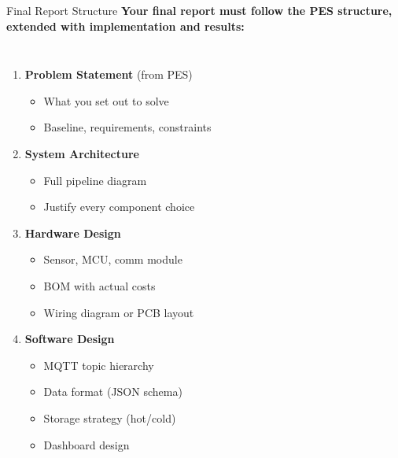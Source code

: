 \documentclass[aspectratio=169,11pt]{beamer}
\begin{document}
\begin{frame}{Final Report Structure}
    \textbf{Your final report must follow the PES structure, extended with implementation and results:}

    \vspace{0.2cm}
    \begin{columns}
        \begin{enumerate}
            \item \textbf{Problem Statement} (from PES)
            \begin{itemize}
                \item What you set out to solve
                \item Baseline, requirements, constraints
            \end{itemize}
            \item \textbf{System Architecture}
            \begin{itemize}
                \item Full pipeline diagram
                \item Justify every component choice
            \end{itemize}
            \item \textbf{Hardware Design}
            \begin{itemize}
                \item Sensor, MCU, comm module
                \item BOM with actual costs
                \item Wiring diagram or PCB layout
            \end{itemize}
            \item \textbf{Software Design}
            \begin{itemize}
                \item MQTT topic hierarchy
                \item Data format (JSON schema)
                \item Storage strategy (hot/cold)
                \item Dashboard design
            \end{itemize}
        \end{enumerate}


\end{columns}
\end{frame}
\end{document}
